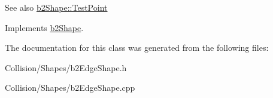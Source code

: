 \begin{DoxySeeAlso}{See also}
\mbox{\hyperlink{classb2Shape_a6ac968e403e2d93e8ae46d728a2e50fa}{b2\+Shape\+::\+Test\+Point}} 
\end{DoxySeeAlso}


Implements \mbox{\hyperlink{classb2Shape_a6ac968e403e2d93e8ae46d728a2e50fa}{b2\+Shape}}.



The documentation for this class was generated from the following files\+:\begin{DoxyCompactItemize}
\item 
Collision/\+Shapes/b2\+Edge\+Shape.\+h\item 
Collision/\+Shapes/b2\+Edge\+Shape.\+cpp\end{DoxyCompactItemize}

